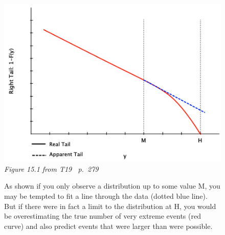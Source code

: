 \begin{figure}[htb!]
    \centering
    \includegraphics[width=1\linewidth]{images/taleb-limit-slimmed.png}\\
    \textit{Figure 15.1 from T19~\cite{taleb2019statistical} p.~279}
   \caption{As shown if you only
   observe a distribution up to some value M,
    you may be tempted to fit a line through the
   data (dotted blue line).
   But if there were in fact a limit to the distribution at H,
   you would be overestimating
   the true number of very extreme events (red curve)
   and also predict events that were larger than were possible.}
   \label{fig:up-bound-taleb}

\end{figure}
